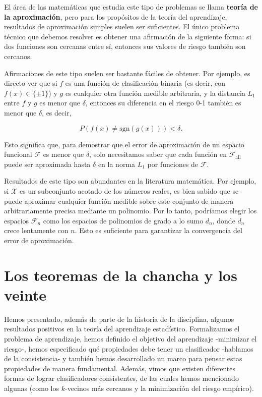 \documentclass{report}
\begin{document}
El área de las matemáticas que estudia este tipo de problemas se llama \textbf{teoría de la aproximación},
pero para los propósitos de la teoría del aprendizaje, resultados de aproximación simples suelen ser
suficientes. El único
problema técnico que debemos resolver es obtener una afirmación de la siguiente forma: si dos funciones
son cercanas entre sí, entonces sus valores de riesgo también son cercanos.

Afirmaciones de este tipo suelen ser bastante fáciles de obtener. Por ejemplo, es directo ver que si
\(f\) es una función de clasificación binaria (es decir, con \(f(x) \in \{\pm1\}\)) y \(g\) es cualquier
otra función medible arbitraria, y la distancia \(L_1\) entre \(f\) y \(g\) es menor que \(\delta\),
entonces su diferencia en el riesgo 0-1 también es menor que \(\delta\), es decir,

\[
P(f(x) \neq \text{sgn}(g(x))) < \delta.
\]

Esto significa que, para demostrar que el error de aproximación de un espacio funcional \(\mathcal{F}\)
es menor que \(\delta\), solo necesitamos saber que cada función en \(\mathcal{F}_{\text{all}}\) puede
ser aproximada hasta \(\delta\) en la norma \(L_1\) por funciones de \(\mathcal{F}\).

Resultados de este tipo son abundantes en la literatura matemática. Por ejemplo, si \(\mathcal{X}\) es un subconjunto
acotado de los números reales, es bien sabido que se puede aproximar cualquier función medible sobre este
conjunto de manera arbitrariamente precisa mediante un polinomio. Por lo tanto, podríamos elegir los espacios
\(\mathcal{F}_n\) como los espacios de polinomios de grado a lo sumo \(d_n\), donde \(d_n\) crece lentamente
con \(n\). Esto es suficiente para garantizar la convergencia del error de aproximación.

\section{Los teoremas de la chancha y los veinte}

Hemos presentado, además de parte de la historia de la disciplina, algunos resultados positivos en la teoría del aprendizaje estadístico.
Formalizamos el problema de aprendizaje, hemos definido el objetivo del aprendizaje -minimizar el
riesgo-, hemos especificado qué propiedades debe tener un clasificador -hablamos de la consistencia- y también hemos desarrollado un
marco para pensar estas propiedades de manera fundamental. Además, vimos que existen
diferentes formas de lograr clasificadores consistentes, de las cuales hemos mencionado algunas (como los \(k\)-vecinos más cercanos y la
minimización del riesgo empírico).
\end{document}

